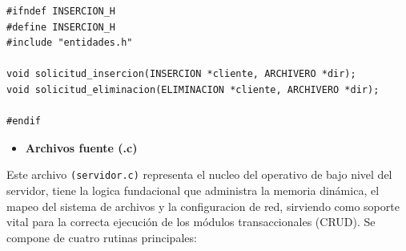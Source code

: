 \documentclass[12pt]{article}
\begin{document}
\begin{lstlisting}[style=estiloC ,title={Código 3. Servidor TCP (insercion.h)}]
#ifndef INSERCION_H 
#define INSERCION_H
#include "entidades.h"

void solicitud_insercion(INSERCION *cliente, ARCHIVERO *dir);
void solicitud_eliminacion(ELIMINACION *cliente, ARCHIVERO *dir);

#endif
\end{lstlisting}

\begin{itemize}
    \item \textbf{Archivos fuente (.c)}
\end{itemize}

Este archivo \texttt{(servidor.c)} representa el nucleo del operativo de bajo nivel del servidor, tiene la logica fundacional que administra la memoria dinámica, el mapeo del sistema de archivos y la configuracion de red, sirviendo como soporte vital para la correcta ejecución de los módulos transaccionales (CRUD). Se compone de cuatro rutinas principales:
\end{document}
